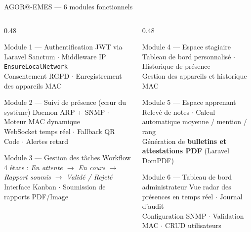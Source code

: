 \documentclass[aspectratio=169, 10pt]{beamer}
\begin{document}
\begin{frame}{AGOR@-EMES --- 6 modules fonctionnels}
  \begin{columns}[T]
    \begin{column}{0.48\textwidth}
      \begin{block}{\scriptsize Module 1 --- Authentification}
        \tiny JWT via Laravel Sanctum $\cdot$ Middleware IP \texttt{EnsureLocalNetwork}\\
        Consentement RGPD $\cdot$ Enregistrement des appareils MAC
      \end{block}
      \vspace{3pt}
      \begin{alertblock}{\scriptsize Module 2 --- Suivi de présence \textnormal{(c\oe ur du système)}}
        \tiny Daemon ARP + SNMP $\cdot$ Moteur MAC dynamique\\
        WebSocket temps réel $\cdot$ Fallback QR Code $\cdot$ Alertes retard
      \end{alertblock}
      \vspace{3pt}
      \begin{block}{\scriptsize Module 3 --- Gestion des tâches}
        \tiny Workflow 4 états : \textit{En attente $\to$ En cours $\to$ Rapport soumis $\to$ Validé / Rejeté}\\
        Interface Kanban $\cdot$ Soumission de rapports PDF/Image
      \end{block}
    \end{column}
    \begin{column}{0.48\textwidth}
      \begin{block}{\scriptsize Module 4 --- Espace stagiaire}
        \tiny Tableau de bord personnalisé $\cdot$ Historique de présence\\
        Gestion des appareils et historique MAC
      \end{block}
      \vspace{3pt}
      \begin{block}{\scriptsize Module 5 --- Espace apprenant}
        \tiny Relevé de notes $\cdot$ Calcul automatique moyenne / mention / rang\\
        Génération de \textbf{bulletins et attestations PDF} (Laravel DomPDF)
      \end{block}
      \vspace{3pt}
      \begin{block}{\scriptsize Module 6 --- Tableau de bord administrateur}
        \tiny Vue radar des présences en temps réel $\cdot$ Journal d'audit\\
        Configuration SNMP $\cdot$ Validation MAC $\cdot$ CRUD utilisateurs
      \end{block}
    \end{column}
  \end{columns}
\end{frame}
\end{document}
